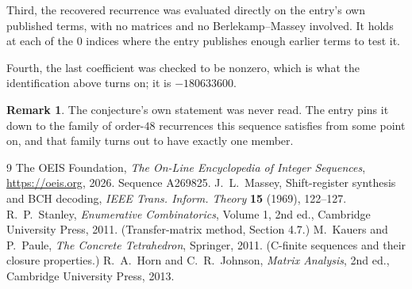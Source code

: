 \documentclass[11pt,a4paper]{article}
\theoremstyle{plain}
\theoremstyle{definition}
\newtheorem{remark}[theorem]{Remark}
\begin{document}
Third, the recovered recurrence was evaluated directly on the entry's own published terms, with
no matrices and no Berlekamp--Massey involved. It holds at each of the $0$ indices where
the entry publishes enough earlier terms to test it.

Fourth, the last coefficient was checked to be nonzero, which is what the identification above
turns on; it is $-180633600$.

\begin{remark}
The conjecture's own statement was never read. The entry pins it down to the family of
order-$48$ recurrences this sequence satisfies from some point on, and that family turns
out to have exactly one member.
\end{remark}

\begin{thebibliography}{9}
 The OEIS Foundation, \emph{The On-Line Encyclopedia of Integer
Sequences}, \url{https://oeis.org}, 2026. Sequence A269825.
 J.~L.~Massey, Shift-register synthesis and BCH decoding, \emph{IEEE
Trans. Inform. Theory} \textbf{15} (1969), 122--127.
 R.~P.~Stanley, \emph{Enumerative Combinatorics}, Volume 1, 2nd ed.,
Cambridge University Press, 2011. (Transfer-matrix method, Section 4.7.)
 M.~Kauers and P.~Paule, \emph{The Concrete Tetrahedron}, Springer, 2011.
(C-finite sequences and their closure properties.)
 R.~A.~Horn and C.~R.~Johnson, \emph{Matrix Analysis}, 2nd ed., Cambridge
University Press, 2013.
\end{thebibliography}
\end{document}
